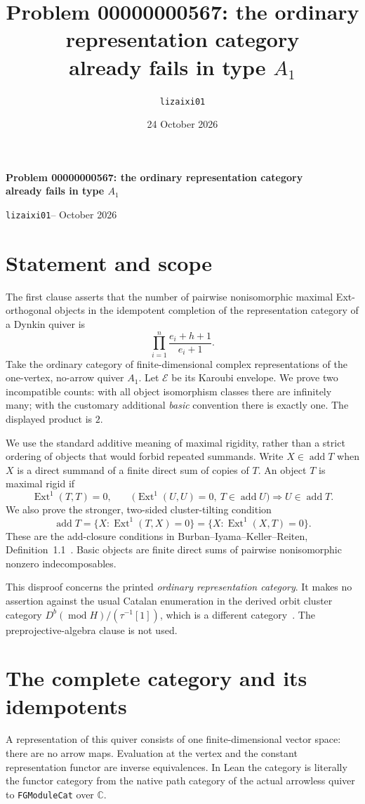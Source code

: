 \documentclass[11pt,a4paper]{article}
\title{Problem 00000000567: the ordinary representation category\texorpdfstring{\\}{ }already fails in type \texorpdfstring{$A_1$}{A1}}
\author{\texttt{lizaixi01}}
\date{24 October 2026}
\newcommand{\C}{\mathbb C}
\newcommand{\E}{\mathcal E}
\newcommand{\add}{\operatorname{add}}
\newcommand{\Ext}{\operatorname{Ext}}
\begin{document}
\begin{center}
{\Large\bfseries Problem 00000000567: the ordinary representation category\\
already fails in type $A_1$}\par
\smallskip
\texttt{lizaixi01}\quad --  October 2026
\end{center}

\section*{Statement and scope}
The first clause asserts that the number of pairwise nonisomorphic maximal
Ext-orthogonal objects in the idempotent completion of the representation
category of a Dynkin quiver is
\[
  \prod_{i=1}^{n}\frac{e_i+h+1}{e_i+1}.
\]
Take the ordinary category of finite-dimensional complex representations of the
one-vertex, no-arrow quiver $A_1$. Let $\E$ be its Karoubi envelope. We prove
two incompatible counts: with all object isomorphism classes there are
infinitely many; with the customary additional \emph{basic} convention there
is exactly one. The displayed product is $2$.

We use the standard additive meaning of maximal rigidity, rather than a strict
ordering of objects that would forbid repeated summands. Write $X\in\add T$
when $X$ is a direct summand of a finite direct sum of copies of $T$.
An object $T$ is maximal rigid if
\[
 \Ext^1(T,T)=0,\qquad
 \bigl(\Ext^1(U,U)=0,\ T\in\add U\bigr)\Longrightarrow U\in\add T.
\]
We also prove the stronger, two-sided cluster-tilting condition
\[
 \add T=\{X:\Ext^1(T,X)=0\}=\{X:\Ext^1(X,T)=0\}.
\]
These are the add-closure conditions in Burban--Iyama--Keller--Reiten,
Definition~1.1~\cite{bikr}. Basic objects are finite direct sums of pairwise
nonisomorphic nonzero indecomposables.

This disproof concerns the printed \emph{ordinary representation category}.
It makes no assertion against the usual Catalan enumeration in the derived
orbit cluster category $D^b(\operatorname{mod}H)/(\tau^{-1}[1])$, which is a
different category~\cite{bmrrt}. The preprojective-algebra clause is not used.

\section*{The complete category and its idempotents}
A representation of this quiver consists of one finite-dimensional vector
space: there are no arrow maps. Evaluation at the vertex and the constant
representation functor are inverse equivalences. In Lean the category is
literally the functor category from the native path category of the actual
arrowless quiver to \texttt{FGModuleCat} over $\C$.
\end{document}
